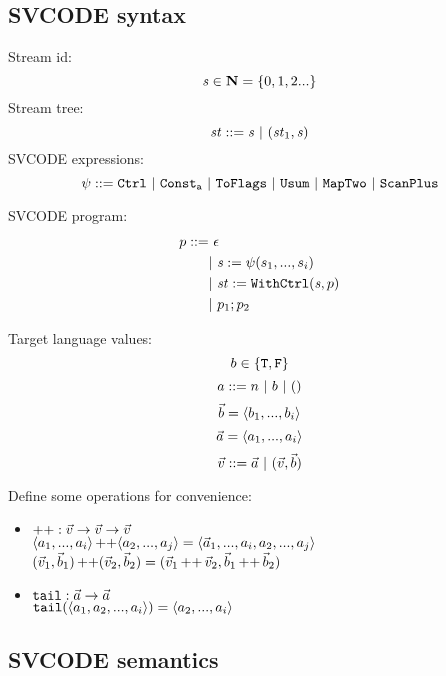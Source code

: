 \subsection{SVCODE syntax}
Stream id: $$\mathit{s} \in \mathbf{N} = \{0,1,2...\}$$
Stream tree: $$ \mathit{st} ::= \mathit{s} \ | \ (\mathit{st}_1,\mathit{s}) $$
SVCODE expressions: $$\psi ::= \mathtt{Ctrl} \ | \ \mathtt{Const_{a}} \ | \ \mathtt{ToFlags}
\ | \ \mathtt{Usum} \ | \ \mathtt{MapTwo} \ | \ \mathtt{ScanPlus} $$

SVCODE program: 
\begin{align*}
	p ::= & \ \epsilon \\
	     &| \ \mathit{s} := \psi(s_1,...,s_i) \\
	     &| \ \mathit{st} := \mathtt{WithCtrl}(\mathit{s},p) \\
	     &| \ p_1;p_2 	 
\end{align*}

Target language values: 
$$b \in \{\mathtt{T},\mathtt{F} \}$$
$$a ::= n \ | \ b \ | \ \unit$$
$$\vec b = \langle b_1,...,b_i \rangle$$ 
$$\vec a = \langle a_1,...,a_i \rangle  $$
$$\v ::= \a \ | \ (\v,\b) $$

Define some operations for convenience:
\begin{itemize}
	\item $\operatorname{++}: \vec v \rightarrow  \vec v \rightarrow \vec v$ \\
	  $\langle a_1,...,a_i \rangle \operatorname{++} \langle a_2,...,a_j \rangle = \langle \vec a_1,...,a_i,a_2,...,a_j \rangle $ \\
	  $(\vec v_1,\vec b_1) \operatorname{++} (\vec v_2,\vec b_2) = (\vec v_1 \operatorname{++} \vec v_2, \vec b_1 \operatorname{++} \vec b_2)$
	\item $\texttt{tail}: \vec a \rightarrow \vec a$ \\
	      $\mathtt{tail}(\langle a_1, a_2,...,a_i \rangle) = \langle a_2,...,a_i \rangle$
\end{itemize}


\subsection{SVCODE semantics}



